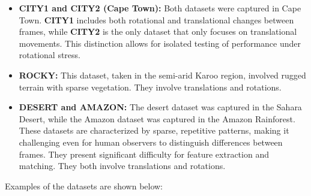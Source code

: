 \begin{itemize}
    \item \textbf{CITY1 and CITY2 (Cape Town):}  
    Both datasets were captured in Cape Town. \textbf{CITY1} includes both rotational and translational changes between frames, while \textbf{CITY2} is the only dataset that only focuses on translational movements. This distinction allows for isolated testing of performance under rotational stress.
    
    \item \textbf{ROCKY:}  
    This dataset, taken in the semi-arid Karoo region, involved rugged terrain with sparse vegetation. They involve translations and rotations. 
    
    \item \textbf{DESERT and AMAZON:}  
    The desert dataset was captured in the Sahara Desert, while the Amazon dataset was captured in the Amazon Rainforest. These datasets are characterized by sparse, repetitive patterns, making it challenging even for human observers to distinguish differences between frames. They present significant difficulty for feature extraction and matching. They both involve translations and rotations.
\end{itemize}

Examples of the datasets are shown below:

